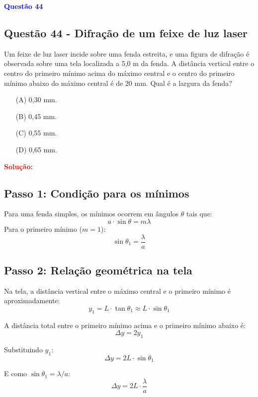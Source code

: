 \begin{flushleft}
\textbf{\textcolor{blue}{\Large Quest\~ao 44}}\\
\noindent
\subsection{Quest\~ao 44 - Difração de um feixe de luz laser}
Um feixe de luz laser incide sobre uma fenda estreita, e uma
figura de difração é observada sobre uma tela localizada a 5,0 m
da fenda. A distância vertical entre o centro do primeiro mínimo
acima do máximo central e o centro do primeiro mínimo abaixo
do máximo central é de 20 mm. Qual é a largura da fenda?

\begin{itemize}
\item[(A)] 0,30 mm.
\item[(B)] 0,45 mm.
\item[(C)] 0,55 mm.
\item[(D)] 0,65 mm.
\end{itemize}

\vspace{0.5cm}

\textcolor{red}{\textbf{Solução:}}\\

\subsection*{Passo 1: Condição para os mínimos}

Para uma fenda simples, os mínimos ocorrem em ângulos \(\theta\) tais que:
\[
a \cdot \sin\theta = m\lambda
\]
Para o primeiro mínimo (\(m=1\)):
\[
\sin\theta_1 = \frac{\lambda}{a}
\]

\vspace{0.5cm}

\subsection*{Passo 2: Relação geométrica na tela}

Na tela, a distância vertical entre o máximo central e o primeiro mínimo é aproximadamente:
\[
y_1 = L \cdot \tan\theta_1 \approx L \cdot \sin\theta_1
\]

A distância total entre o primeiro mínimo acima e o primeiro mínimo abaixo é:
\[
\Delta y = 2y_1
\]

Substituindo \(y_1\):
\[
\Delta y = 2L \cdot \sin\theta_1
\]

E como \(\sin\theta_1 = \lambda/a\):
\[
\Delta y = 2L \cdot \frac{\lambda}{a}
\]


\end{flushleft}
